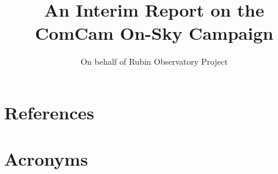 \documentclass[SE,lsstdraft,authoryear,toc]{lsstdoc}
\title{An Interim Report on the ComCam On-Sky Campaign}
\author{%
On behalf of Rubin Observatory Project
}
\date{\vcsDate}
\begin{document}
\maketitle












































\appendix
\section{References} \label{sec:bib}
\renewcommand{\refname}{} %


\section{Acronyms} \label{sec:acronyms}

\end{document}
